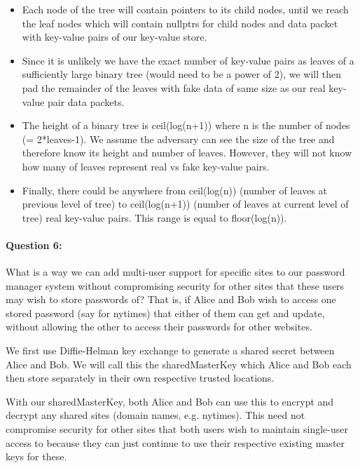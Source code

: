 \documentclass[12pt,letterpaper,twoside]{article}
\begin{document}
\begin{itemize}

    \item Each node of the tree will contain pointers to its child nodes, until we reach
        the leaf nodes which will contain nullptrs for child nodes and data packet with
        key-value pairs of our key-value store.

    \item Since it is unlikely we have the exact number of key-value pairs as
        leaves of a sufficiently large binary tree (would need to be a power of
        2), we will then pad the remainder of the leaves with fake data of same
        size as our real key-value pair data packets.

    \item The height of a binary tree is ceil(log(n+1)) where n is the number of
        nodes (= 2*leaves-1). We assume the adversary can see the size of the
        tree and therefore know its height and number of leaves. However, they
        will not know how many of leaves represent real vs fake key-value pairs.

    \item Finally, there could be anywhere from ceil(log(n)) (number of
        leaves at previous level of tree) to ceil(log(n+1)) (number of leaves at
        current level of tree) real key-value pairs. This range is equal to
        floor(log(n)).

\end{itemize}

\paragraph{Question 6: } What is a way we can add multi-user support for
specific sites to our password manager system without compromising security for
other sites that these users may wish to store passwords of? That is, if Alice
and Bob wish to access one stored password (say for nytimes) that either of them
can get and update, without allowing the other to access their passwords for
other websites.

We first use Diffie-Helman key exchange to generate a shared secret between
Alice and Bob. We will call this the sharedMasterKey which Alice and Bob each
then store separately in their own respective trusted locations.

With our sharedMasterKey, both Alice and Bob can use this to encrypt and decrypt
any shared sites (domain names, e.g. nytimes). This need not compromise security
for other sites that both users wish to maintain single-user access to because
they can just continue to use their respective existing master keys for these.
\end{document}
